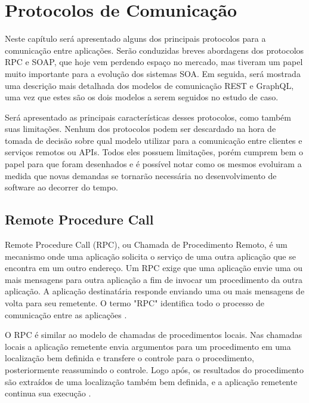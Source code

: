 \chapter[Protocolos de Comunicação]{Protocolos de Comunicação}

Neste capítulo será apresentado alguns dos principais protocolos para a comunicação entre aplicações. Serão conduzidas breves abordagens dos protocolos RPC e SOAP, que hoje vem perdendo espaço no mercado, mas tiveram um papel muito importante para a evolução dos sistemas SOA. Em seguida, será mostrada uma descrição mais detalhada dos modelos de comunicação REST e GraphQL, uma vez que estes são os dois modelos a serem seguidos no estudo de caso.

Será apresentado as principais características desses protocolos, como também suas limitações. Nenhum dos protocolos podem ser descardado na hora de tomada de decisão sobre qual modelo utilizar para a comunicação entre clientes e serviços remotos ou APIs. Todos eles possuem limitações, porém cumprem bem o papel para que foram desenhados e é possível notar como os mesmos evoluiram a medida que novas demandas se tornarão necessária no desenvolvimento de software ao decorrer do tempo.

\section{Remote Procedure Call}\label{sec:rpc}

Remote Procedure Call (RPC), ou Chamada de Procedimento Remoto, é um mecanismo onde uma aplicação solicita o serviço de uma outra aplicação que se encontra em um outro endereço. Um RPC exige que uma aplicação envie uma ou mais mensagens para outra aplicação a fim de invocar um procedimento da outra aplicação. A aplicação destinatária responde enviando uma ou mais mensagens de volta para seu remetente. O termo "RPC" identifica todo o processo de comunicação entre as aplicações \cite{merrick2006xml}.

O RPC é similar ao modelo de  chamadas de procedimentos locais. Nas chamadas locais a aplicação remetente envia argumentos para um procedimento em uma localização bem definida e transfere o controle para o procedimento, posteriormente reassumindo o controle. Logo após, os resultados do procedimento são extraídos de uma localização também bem definida, e a aplicação remetente continua sua execução \cite{rfc1831:rpc}.

